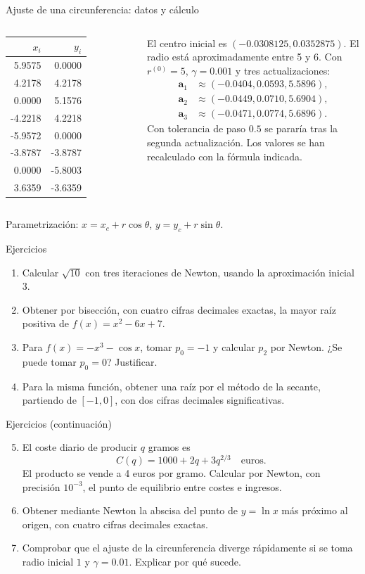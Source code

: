 \documentclass[main.tex]{subfiles}
\begin{document}
\begin{frame}[t]{Ajuste de una circunferencia: datos y cálculo}
\begin{columns}[T]
\scriptsize
\begin{tabular}{r|r}$x_i$&$y_i$\\\hline
5.9575&0.0000\\4.2178&4.2178\\0.0000&5.1576\\-4.2218&4.2218\\-5.9572&0.0000\\-3.8787&-3.8787\\0.0000&-5.8003\\3.6359&-3.6359
\end{tabular}
\small
El centro inicial es $(-0.0308125,0.0352875)$. El radio está aproximadamente entre 5 y 6.
\medskip
Con $r^{(0)}=5$, $\gamma=0.001$ y tres actualizaciones:
\[\begin{aligned}
\boldsymbol{a}_1&\approx(-0.0404,0.0593,5.5896),\\
\boldsymbol{a}_2&\approx(-0.0449,0.0710,5.6904),\\
\boldsymbol{a}_3&\approx(-0.0471,0.0774,5.6896).
\end{aligned}\]
\scriptsize Con tolerancia de paso $0.5$ se pararía tras la segunda actualización. Los valores se han recalculado con la fórmula indicada.
\end{columns}
\medskip\small Parametrización: $x=x_c+r\cos\theta$, $y=y_c+r\sin\theta$.
\end{frame}
\begin{frame}[t]{Ejercicios}
\small\begin{enumerate}
\item Calcular $\sqrt{10}$ con tres iteraciones de Newton, usando la aproximación inicial $3$.
\item Obtener por bisección, con cuatro cifras decimales exactas, la mayor raíz positiva de $f(x)=x^2-6x+7$.
\item Para $f(x)=-x^3-\cos x$, tomar $p_0=-1$ y calcular $p_2$ por Newton. ¿Se puede tomar $p_0=0$? Justificar.
\item Para la misma función, obtener una raíz por el método de la secante, partiendo de $[-1,0]$, con dos cifras decimales significativas.
\end{enumerate}
\end{frame}
\begin{frame}[t]{Ejercicios (continuación)}
\small\begin{enumerate}\setcounter{enumi}{4}
\item El coste diario de producir $q$ gramos es
\[C(q)=1000+2q+3q^{2/3}\quad\text{euros}.\]
El producto se vende a 4 euros por gramo. Calcular por Newton, con precisión $10^{-3}$, el punto de equilibrio entre costes e ingresos.
\item Obtener mediante Newton la abscisa del punto de $y=\ln x$ más próximo al origen, con cuatro cifras decimales exactas.
\item Comprobar que el ajuste de la circunferencia diverge rápidamente si se toma radio inicial $1$ y $\gamma=0.01$. Explicar por qué sucede.
\end{enumerate}
\end{frame}
\end{document}
